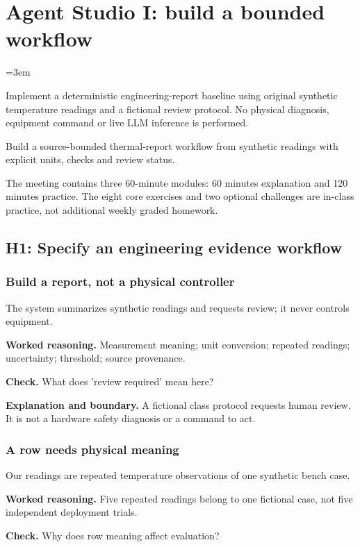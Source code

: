 \chapter{Agent Studio I: build a bounded workflow}\label{chap:w15-studio}\label{chap:testing}
\emergencystretch=3em

Implement a deterministic engineering-report baseline using original synthetic temperature readings and a fictional review protocol. No physical diagnosis, equipment command or live LLM inference is performed.
\begin{learningbox}Build a source-bounded thermal-report workflow from synthetic readings with explicit units, checks and review status.\end{learningbox}
The meeting contains three 60-minute modules: 60 minutes explanation and 120 minutes practice. The eight core exercises and two optional challenges are in-class practice, not additional weekly graded homework.
\section{H1: Specify an engineering evidence workflow}
\subsection{Build a report, not a physical controller}
The system summarizes synthetic readings and requests review; it never controls equipment.

\textbf{Worked reasoning.} Measurement meaning; unit conversion; repeated readings; uncertainty; threshold; source provenance.

\textbf{Check.} What does 'review required' mean here?

\textbf{Explanation and boundary.} A fictional class protocol requests human review. It is not a hardware safety diagnosis or a command to act.

\subsection{A row needs physical meaning}
Our readings are repeated temperature observations of one synthetic bench case.

\textbf{Worked reasoning.} Five repeated readings belong to one fictional case, not five independent deployment trials.

\textbf{Check.} Why does row meaning affect evaluation?

